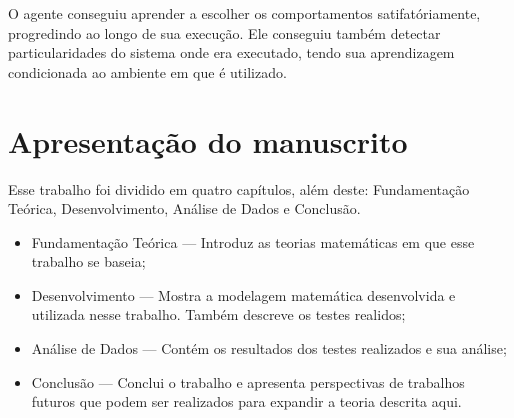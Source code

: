 O agente conseguiu aprender a escolher os comportamentos satifatóriamente, progredindo ao longo de sua execução. Ele conseguiu também detectar particularidades do sistema onde era executado, tendo sua aprendizagem condicionada ao ambiente em que é utilizado.


\section{Apresentação do manuscrito}

Esse trabalho foi dividido em quatro capítulos, além deste: Fundamentação Teórica, Desenvolvimento, Análise de Dados e Conclusão.

\begin{itemize}
	\item Fundamentação Teórica --- Introduz as teorias matemáticas em que esse trabalho se baseia;
	\item Desenvolvimento --- Mostra a modelagem matemática desenvolvida e utilizada nesse trabalho. Também descreve os testes realidos;
	\item Análise de Dados --- Contém os resultados dos testes realizados e sua análise;
	\item Conclusão --- Conclui o trabalho e apresenta perspectivas de trabalhos futuros que podem ser realizados para expandir a teoria descrita aqui.
\end{itemize}
